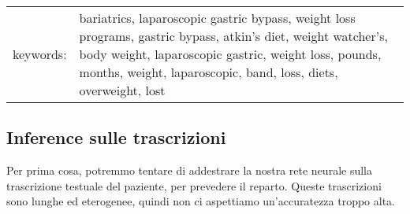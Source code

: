 \begin{table}[h]
\begin{tabularx}{\textwidth}{|l|X|}
        keywords:             & bariatrics, laparoscopic gastric bypass, weight loss programs, gastric bypass, atkin's diet, weight watcher's, body weight, laparoscopic gastric, weight loss, pounds, months, weight, laparoscopic, band, loss, diets, overweight, lost                                                                                                                                                                                                                                                                                                                                                                                                                                                                                                                                                                                                                                                                                                                                                                                                                                                                                                                                                                                                                                                                                                                                                                                                                                                                                                                                                                                                                                                                                                             \\
    \end{tabularx}
\end{table}
\subsection{Inference sulle trascrizioni}
Per prima cosa, potremmo tentare di addestrare la nostra rete neurale sulla trascrizione testuale del paziente, per prevedere il reparto. Queste trascrizioni sono lunghe ed eterogenee, quindi non ci aspettiamo un'accuratezza troppo alta.
